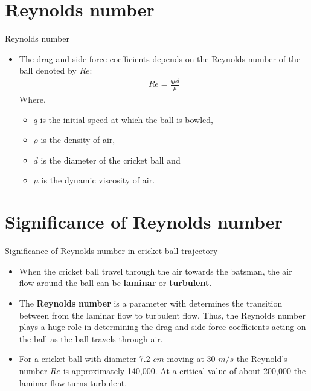 \documentclass{beamer}
\begin{document}
\section{Reynolds number}
\begin{frame}{Reynolds number}
    \begin{itemize}
    \item 
    The drag and side force coefficients depends on the Reynolds number of the ball denoted by $Re$:
    \begin{align}
        Re = \frac{q\rho d}{\mu}
    \end{align}
    Where, 
    \begin{itemize}
        \item $q$ is the initial speed at which the ball is bowled,
        \item $\rho$ is the density of air, 
        \item $d$ is the diameter of the cricket ball and 
        \item $\mu$ is the dynamic viscosity of air.
    \end{itemize}
  \end{itemize}
\end{frame} 
\section{Significance of Reynolds number}
\begin{frame}{Significance of Reynolds number in cricket ball trajectory}
    \begin{itemize}
    \item 
    When the cricket ball travel through the air towards the batsman, the air flow around the ball can be \textbf{laminar} or \textbf{turbulent}.
    \item
    The \textbf{Reynolds} \textbf{number} is a parameter with determines the transition between from the laminar flow to turbulent flow. Thus, the Reynolds number plays a huge role in determining the drag and side force coefficients acting on the ball as the ball travels through air.
    \item
    For a cricket ball with diameter 7.2 $cm$ moving at 30 $m/s$ the Reynold’s number $Re$ is approximately 140,000. At a critical value of about 200,000 the laminar flow turns turbulent.
  \end{itemize}
\end{frame} 
\end{document}
